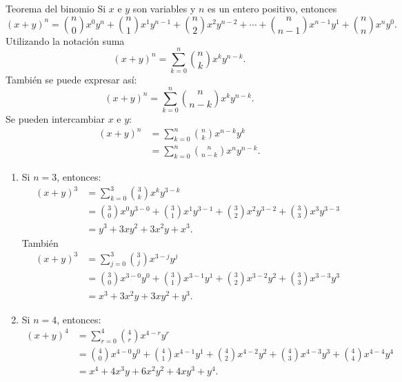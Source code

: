 \newpage

\begin{theorem}{Teorema del binomio}{}
    Si $x$ e $y$ son variables y $n$ es un entero positivo, entonces
    $$(x + y)^n = \binom{n}{0}x^0y^n + \binom{n}{1}x^1y^{n-1} + \binom{n}{2}x^2y^{n-2} + \cdots + \binom{n}{n-1}x^{n-1}y^1 + \binom{n}{n}x^ny^0.$$
    Utilizando la notación suma
    $$(x + y)^n = \sum_{k=0}^{n} \binom{n}{k} x^ky^{n-k}.$$
    También se puede expresar así:
    $$(x + y)^n = \sum_{k=0}^{n} \binom{n}{n-k} x^ky^{n-k}.$$
    Se pueden intercambiar $x$ e $y$:
    \begin{align*}
        (x + y)^n & = \sum_{k=0}^{n} \binom{n}{k} x^{n-k}y^k \\
        & = \sum_{k=0}^{n} \binom{n}{n-k} x^ny^{n-k}.
    \end{align*}
\end{theorem}

\begin{myexample}
    \begin{enumerate}[label=\alph*)]
        \item Si $n = 3$, entonces:
        \begin{align*}
            (x + y)^3 & = \sum_{k = 0}^{3} \binom{3}{k}x^ky^{3-k} \\
            & = \binom{3}{0}x^0y^{3-0} + \binom{3}{1}x^1y^{3-1} + \binom{3}{2}x^2y^{3-2} + \binom{3}{3}x^3y^{3-3} \\
            & = y^3 + 3xy^2 + 3x^2y + x^3.
        \end{align*}
        También
        \begin{align*}
            (x + y)^3 & = \sum_{j = 0}^{3} \binom{3}{j}x^{3-j}y^j \\
            & = \binom{3}{0}x^{3-0}y^0 + \binom{3}{1}x^{3-1}y^1 + \binom{3}{2}x^{3-2}y^2 + \binom{3}{3}x^{3-3}y^3 \\
            & = x^3 + 3x^2y + 3xy^2 + y^3.
        \end{align*}
        \item Si $n = 4$, entonces:
        \begin{align*}
            (x + y)^4 & = \sum_{r=0}^{4} \binom{4}{r} x^{4-r}y^r \\
            & = \binom{4}{0}x^{4-0}y^0 + \binom{4}{1}x^{4-1}y^1 + \binom{4}{2}x^{4-2}y^2 + \binom{4}{3}x^{4-3}y^3 + \binom{4}{4}x^{4-4}y^4 \\
            & = x^4 + 4x^3y + 6x^2y^2 + 4xy^3 + y^4.
        \end{align*}
    \end{enumerate}
\end{myexample}

